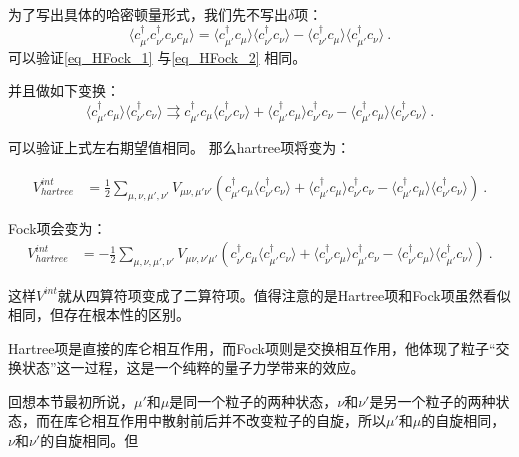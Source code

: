 为了写出具体的哈密顿量形式，我们先不写出$\delta$项：
\begin{equation}\label{eq_HFock_2}
\langle c_{\mu'}^\dagger c_{\nu'}^\dagger c_{\nu}^~ c_{\mu}^~ \rangle = \langle c_{\mu'}^\dagger c_\mu^~\rangle\langle c_{\nu'}^\dagger c_\nu^~\rangle-\langle c_{\nu'}^\dagger c_\mu^~\rangle\langle c_{\mu'}^\dagger c_\nu^~\rangle~.
\end{equation}
可以验证\autoref{eq_HFock_1} 与\autoref{eq_HFock_2} 相同。

并且做如下变换：
$$\langle c_{\mu'}^\dagger c_\mu^~\rangle\langle c_{\nu'}^\dagger c_\nu^~\rangle\rightrightarrows c_{\mu'}^\dagger c_\mu^~\langle c_{\nu'}^\dagger c_\nu^~\rangle+\langle c_{\mu'}^\dagger c_\mu^~\rangle c_{\nu'}^\dagger c_\nu^~-\langle c_{\mu'}^\dagger c_\mu^~\rangle\langle c_{\nu'}^\dagger c_\nu^~\rangle ~.$$

可以验证上式左右期望值相同。
那么hartree项将变为：

\begin{equation}
\begin{aligned}
V^{int}_{hartree}&=\frac{1}{2}\sum\limits_{\mu,\nu,\mu',\nu'}V_{\mu\nu,\mu'\nu'}\left(c_{\mu'}^\dagger c_\mu^~\langle c_{\nu'}^\dagger c_\nu^~\rangle+\langle c_{\mu'}^\dagger c_\mu^~\rangle c_{\nu'}^\dagger c_\nu^~-\langle c_{\mu'}^\dagger c_\mu^~\rangle\langle c_{\nu'}^\dagger c_\nu^~\rangle\right)~.
\end{aligned}
\end{equation}

Fock项会变为：
\begin{equation}
\begin{aligned}
V^{int}_{hartree}&=-\frac{1}{2}\sum\limits_{\mu,\nu,\mu',\nu'}V_{\mu\nu,\nu'\mu'}\left(c_{\nu'}^\dagger c_\mu^~\langle c_{\mu'}^\dagger c_\nu^~\rangle+\langle c_{\nu'}^\dagger c_\mu^~\rangle c_{\mu'}^\dagger c_\nu^~-\langle c_{\nu'}^\dagger c_\mu^~\rangle\langle c_{\mu'}^\dagger c_\nu^~\rangle\right)~.
\end{aligned}
\end{equation}

这样$V^{int}$就从四算符项变成了二算符项。值得注意的是Hartree项和Fock项虽然看似相同，但存在根本性的区别。

Hartree项是直接的库仑相互作用，而Fock项则是交换相互作用，他体现了粒子“交换状态”这一过程，这是一个纯粹的量子力学带来的效应。

回想本节最初所说，$\mu'$和$\mu$是同一个粒子的两种状态，$\nu$和$\nu'$是另一个粒子的两种状态，而在库仑相互作用中散射前后并不改变粒子的自旋，所以$\mu'$和$\mu$的自旋相同，$\nu$和$\nu'$的自旋相同。但
